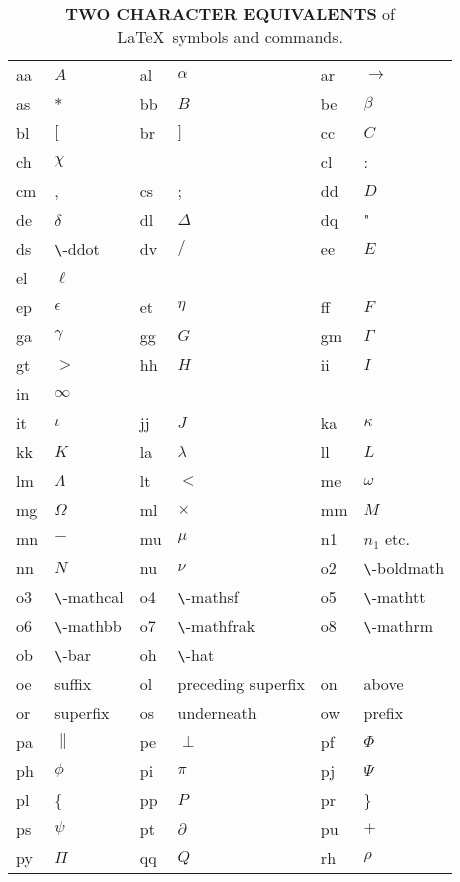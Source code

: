 \begin{table}[tbph]
\begin{center}
\caption{\textbf{\textsf{TWO CHARACTER EQUIVALENTS}} of \LaTeX \ symbols and commands.  \label{tab:twoclatex} }
\begin{tabular}{||p{1.5cm}|p{4cm}||p{1.5cm}|p{4cm}||p{1.5cm}|p{4cm}||}
\hline
aa & $A$ & al & $\alpha$ & ar & $\rightarrow$ \\
as & $*$ & bb & $B$ & be & $\beta$ \\
bl & $[$ & br & $]$ & cc & $C$ \\
ch & $\chi$ & &  & cl & : \\
cm & , & cs & ; & dd & $D$ \\
de & $\delta$ & dl & $\Delta$ & dq & " \\
ds & \verb-\-ddot & dv & $/$ & ee & $E$ \\
el & $\ell$ &  &  & &  \\
ep & $\epsilon$ & et & $\eta$ & ff & $F$ \\
ga & $\gamma$ & gg & $G$ & gm & $\Gamma$ \\
gt & $>$ & hh & $H$ & ii & $I$ \\
in & $\infty$ & & & & \\
it & $\iota$ & jj & $J$ & ka & $\kappa$ \\
kk & $K$ & la & $\lambda$ & ll & $L$ \\
lm & $\Lambda$ & lt & $<$ & me & $\omega$ \\
mg & $\Omega$ & ml & $\times$ & mm & $M$ \\
mn & $-$ & mu & $\mu$ & n1 & $n_1$ etc. \\
nn & $N$ & nu & $\nu$ & o2 & \verb-\-boldmath \\
o3 & \verb-\-mathcal & o4 & \verb-\-mathsf & o5 & \verb-\-mathtt \\
o6 & \verb-\-mathbb & o7 & \verb-\-mathfrak & o8 & \verb-\-mathrm \\
ob & \verb-\-bar & oh & \verb-\-hat & &  \\
oe &  suffix  & ol &  preceding superfix  & on &  above  \\
or &  superfix  & os &  underneath  & ow &  prefix  \\
pa & $\|$ & pe & $\perp$ & pf & $\Phi$ \\
ph & $\phi$ & pi & $\pi$ & pj & $\Psi$ \\
pl & \{ & pp & $P$ & pr & \} \\
ps & $\psi$ & pt & $\partial$ & pu & $+$ \\
py & $\Pi$ & qq & $Q$ & rh & $\rho$ \\

\end{tabular}
\end{center}
\end{table}
